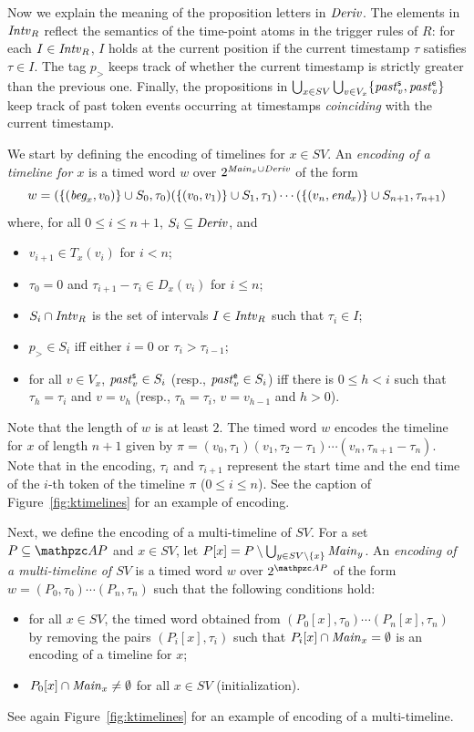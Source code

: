 Now we explain the meaning of the proposition letters in ${\mathit{Deriv}}$.
The elements in  ${\mathit{Intv}}_R$ reflect the semantics of
the time-point atoms in the trigger rules of $R$: for each $I\in {\mathit{Intv}}_R$, $I$ holds at the current position if the current timestamp $\tau$ satisfies
$\tau\in I$.  The tag $p_>$ keeps track of whether the current timestamp is strictly greater than the previous one.
Finally,  the propositions in $\bigcup_{x\in SV}\bigcup_{v\in V_x}\{{\mathit{past}}_v^{\mathsf{s}},{\mathit{past}}_v^{\mathsf{e}}\}$ keep track of past token events occurring at timestamps \emph{coinciding}
with the current timestamp. 

We start by defining the encoding of timelines for $x\in SV$.
%
An \emph{encoding of a timeline for $x$} is
 a timed word $w$ over $2^{{\mathit{Main}}_x \cup {\mathit{Deriv}}}$ of the form
 \[
 w =(\{(\textit{beg}_x,v_0)\}\cup S_0,\tau_0)(\{(v_0,v_1)\}\cup S_1,\tau_1)\cdots (\{(v_n,\textit{end}_x)\}\cup S_{n+1},\tau_{n+1})
 \]
 where, for all $0\leq i\leq n+1$, $S_i\subseteq {\mathit{Deriv}}$, and %
 \begin{itemize}
  \item $v_{i+1}\in T_x(v_i)$ for $i<n$;
 \item $\tau_0=0$ and $\tau_{i+1}-\tau_i \in D_x(v_i)$ for $i\leq n$;
  \item   $S_i\cap {\mathit{Intv}}_R$ is the set of intervals $I\in{\mathit{Intv}}_R$
  such that $\tau_i\in I$;
  \item $p_>\in S_i$ iff either $i=0$ or $\tau_i>\tau_{i-1}$;
  \item for all $v\in V_x$, ${\mathit{past}}^{\mathsf{s}}_v\in S_i$ (resp., ${\mathit{past}}^{\mathsf{e}}_v\in S_i$) iff there is $0\leq h<i$ such that $\tau_h=\tau_i$ and $v= v_h$ (resp., $\tau_h=\tau_i$, $v=v_{h-1}$ and $h>0$).
\end{itemize}
Note that the length of $w$ is at least $2$. The timed word $w$ encodes the timeline for $x$ of length $n+1$
given by $\pi=(v_0,\tau_1) (v_1,\tau_2-\tau_1)\cdots (v_n,\tau_{n+1}-\tau_n)$. Note that in the encoding, $\tau_i$ and $\tau_{i+1}$ represent the start time and the end time
of the $i$-th token of the timeline $\pi$ ($0\leq i\leq n$).
See the caption of Figure~\ref{fig:ktimelines} for an example of encoding.

Next, we define the encoding of a multi-timeline of $SV$.  For a set $P\subseteq \Prop$ and $x\in SV$, let $P[x]= P\setminus \bigcup_{y\in SV\setminus \{x\}}{\mathit{Main}}_y$.
An \emph{encoding of a multi-timeline of $SV$} is
 a timed word $w$ over $2^{\Prop}$ of the form
$
 w =(P_0,\tau_0)\cdots (P_n,\tau_n)
$
 such that  the following conditions hold:
 \begin{itemize}
  \item  for all $x\in SV$, the timed word obtained from $(P_0[x],\tau_0)\cdots (P_n[x],\tau_n)$ by removing
  the pairs $(P_i[x],\tau_i)$ such that $P_i[x]\cap {\mathit{Main}}_x=\emptyset$ is an encoding of a timeline for $x$;
    \item $P_0[x]\cap {\mathit{Main}}_x\neq \emptyset$ for all $x\in SV$ (initialization).
\end{itemize}
See again Figure~\ref{fig:ktimelines} for an example of encoding of a multi-timeline.

